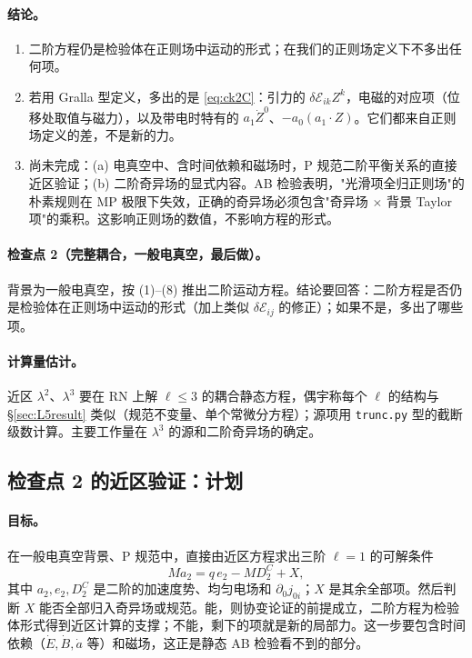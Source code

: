 \documentclass[11pt,a4paper]{ctexart}
\numberwithin{equation}{section}
\begin{document}
\paragraph{结论。}
\begin{enumerate}
\item 二阶方程仍是检验体在正则场中运动的形式；在我们的正则场定义下不多出任何项。
\item 若用 Gralla 型定义，多出的是 \eqref{eq:ck2C}：引力的 $\delta\mathcal E_{ik}Z^k$，电磁的对应项（位移处取值与磁力），以及带电时特有的 $a_1\dot Z^0$、$-a_0(a_1\cdot Z)$。它们都来自正则场定义的差，不是新的力。
\item 尚未完成：(a) 电真空中、含时间依赖和磁场时，P 规范二阶平衡关系的直接近区验证；(b) 二阶奇异场的显式内容。AB 检验表明，"光滑项全归正则场"的朴素规则在 MP 极限下失效，正确的奇异场必须包含"奇异场 $\times$ 背景 Taylor 项"的乘积。这影响正则场的数值，不影响方程的形式。
\end{enumerate}

\paragraph{检查点 2（完整耦合，一般电真空，最后做）。}背景为一般电真空，按 (1)--(8) 推出二阶运动方程。结论要回答：二阶方程是否仍是检验体在正则场中运动的形式（加上类似 $\delta\mathcal E_{ij}$ 的修正）；如果不是，多出了哪些项。

\paragraph{计算量估计。}近区 $\lambda^2$、$\lambda^3$ 要在 RN 上解 $\ell\leq3$ 的耦合静态方程，偶宇称每个 $\ell$ 的结构与 \S\ref{sec:L5result} 类似（规范不变量、单个常微分方程）；源项用 \texttt{trunc.py} 型的截断级数计算。主要工作量在 $\lambda^3$ 的源和二阶奇异场的确定。

\subsection{检查点 2 的近区验证：计划}
\label{sec:L6ck2plan}

\paragraph{目标。}在一般电真空背景、P 规范中，直接由近区方程求出三阶 $\ell=1$ 的可解条件
\begin{equation*}
Ma_2=q\,e_2-M D^C_2+X ,
\end{equation*}
其中 $a_2,e_2,D^C_2$ 是二阶的加速度势、均匀电场和 $\partial_0j_{0i}$；$X$ 是其余全部项。然后判断 $X$ 能否全部归入奇异场或规范。能，则协变论证的前提成立，二阶方程为检验体形式得到近区计算的支撑；不能，剩下的项就是新的局部力。这一步要包含时间依赖（$\dot E,\dot B,\dot a$ 等）和磁场，这正是静态 AB 检验看不到的部分。
\end{document}
